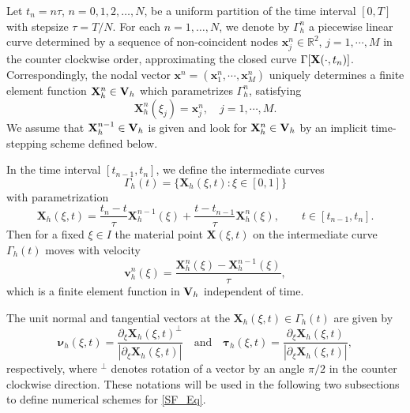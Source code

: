 \documentclass[review]{elsarticle}
\begin{document}
Let $t_n=n\tau$, $n=0,1,2,\dots,N$, be a uniform partition of the time interval $[0,T]$ with stepsize $\tau=T/N$. For each $n=1,\dots,N$, we denote by $\Gamma_h^{n}$ a piecewise linear curve determined by a sequence of non-coincident nodes $\mathbf{x}_j^{n}\in \mathbb{R}^2$, $j = 1, \cdots, M$ in the counter clockwise order, approximating the closed curve $\Gamma[{\bf X}(\cdot,t_n)]$. Correspondingly, the nodal vector $\mathbf{x}^n = (\mathbf{x}_1^n, \cdots, \mathbf{x}_M^n)$ uniquely determines a finite element function $\mathbf{X}_h^n\in {\bf V}_h$ which parametrizes $\Gamma_h^n$, satisfying
$$
\mathbf{X}_h^n(\xi_j) = \mathbf{x}_j^n,\quad j = 1, \cdots, M.
$$
We assume that $\mathbf{X}_h^{n-1}\in {\bf V}_h$ is given and look for $\mathbf{X}_h^{n}\in {\bf V}_h$ by an implicit time-stepping scheme defined below.

In the time interval $[t_{n-1}, t_{n}]$, we define the intermediate curves
$$\Gamma_h(t) = \{\mathbf{X}_h(\xi, t): \xi\in[0, 1]\}$$ with parametrization
\begin{equation}\label{eq:u_intermediate}
    \mathbf{X}_h(\xi, t) = \dfrac{t_{n} - t}{\tau}\mathbf{X}_h^{n - 1}(\xi) + \dfrac{t - t_{n-1}}{\tau}\mathbf{X}_h^n(\xi), \qquad t\in [t_{n-1}, t_{n}] .
\end{equation}
Then for a fixed $\xi\in I$ the material point $\mathbf{X}(\xi, t)$ on the intermediate curve $\Gamma_h(t)$ moves with velocity
\begin{equation}\label{eq:velocity}
    \mathbf{v}_h^n(\xi) = \dfrac{\mathbf{X}_h^n(\xi) - \mathbf{X}_h^{n - 1}(\xi)}{\tau},
\end{equation}
which is a finite element function in ${\bf V}_h$ independent of time.

The unit normal and tangential vectors at the $\mathbf{X}_h(\xi, t)\in \Gamma_h(t)$ are given by
\begin{equation}\label{eq:nu_tau_intermediate}
    \boldsymbol\nu_h(\xi, t) = \dfrac{\partial_\xi\mathbf{X}_h(\xi, t)^\perp}{|\partial_\xi\mathbf{X}_h(\xi, t)|}
    \quad\mbox{and} \quad
    \boldsymbol\tau_h(\xi, t) = \dfrac{\partial_\xi\mathbf{X}_h(\xi, t)}{|\partial_\xi\mathbf{X}_h(\xi, t)|} ,
\end{equation}
respectively, where $^\perp$ denotes rotation of a vector by an angle $\pi/2$ in the counter clockwise direction. These notations will be used in the following two subsections to define numerical schemes for \eqref{SF_Eq}.

\end{document}
